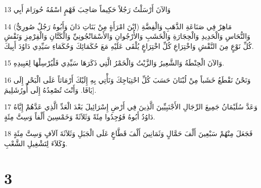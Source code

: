 \par 13 وَالآنَ أَرْسَلْتُ رَجُلاً حَكِيماً صَاحِبَ فَهْمٍ اسْمُهُ حُورَامَ أَبِي
\par 14 (ابْنَ امْرَأَةٍ مِنْ بَنَاتِ دَانَ وَأَبُوهُ رَجُلٌ صُورِيٌّ) مَاهِرٌ فِي صَنَاعَةِ الذَّهَبِ وَالْفِضَّةِ وَالنُّحَاسِ وَالْحَدِيدِ وَالْحِجَارَةِ وَالْخَشَبِ وَالأُرْجُوانِ وَالأَسْمَانْجُونِيِّ وَالْكَتَّانِ وَالْقِرْمِزِ وَنَقْشِ كُلِّ نَوْعٍ مِنَ النَّقْشِ وَاخْتِرَاعِ كُلِّ اخْتِرَاعٍ يُلْقَى عَلَيْهِ مَعَ حُكَمَائِكَ وَحُكَمَاءِ سَيِّدِي دَاوُدَ أَبِيكَ.
\par 15 وَالآنَ الْحِنْطَةُ وَالشَّعِيرُ وَالزَّيْتُ وَالْخَمْرُ الَّتِي ذَكَرَهَا سَيِّدِي فَلْيُرْسِلْهَا لِعَبِيدِهِ.
\par 16 وَنَحْنُ نَقْطَعُ خَشَباً مِنْ لُبْنَانَ حَسَبَ كُلِّ احْتِيَاجِكَ وَنَأْتِي بِهِ إِلَيْكَ أَرْمَاثاً عَلَى الْبَحْرِ إِلَى يَافَا. وَأَنْتَ تُصْعِدُهُ إِلَى أُورُشَلِيمَ].
\par 17 وَعَدَّ سُلَيْمَانُ جَمِيعَ الرِّجَالِ الأَجْنَبِيِّينَ الَّذِينَ فِي أَرْضِ إِسْرَائِيلَ بَعْدَ الْعَدِّ الَّذِي عَدَّهُمْ إِيَّاهُ دَاوُدُ أَبُوهُ فَوُجِدُوا مِئَةً وَثَلاَثَةً وَخَمْسِينَ أَلْفاً وَسِتَّ مِئَةٍ.
\par 18 فَجَعَلَ مِنْهُمْ سَبْعِينَ أَلْفَ حَمَّالٍ وَثَمَانِينَ أَلْفَ قَطَّاعٍ عَلَى الْجَبَلِ وَثَلاَثَةَ آلاَفٍ وَسِتَّ مِئَةٍ وُكَلاَءَ لِتَشْغِيلِ الشَّعْبِ.

\chapter{3}


